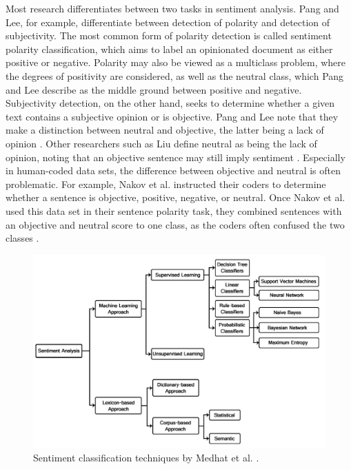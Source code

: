 Most research differentiates between two tasks in sentiment analysis. Pang and Lee, for example, differentiate between detection of polarity and detection of subjectivity. The most common form of polarity detection is called sentiment polarity classification, which aims to label an opinionated document as either positive or negative. Polarity may also be viewed as a multiclass problem, where the degrees of positivity are considered, as well as the neutral class, which Pang and Lee describe as the middle ground between positive and negative. Subjectivity detection, on the other hand, seeks to determine whether a given text contains a subjective opinion or is objective. Pang and Lee note that they make a distinction between neutral and objective, the latter being a lack of opinion \cite{DBLP:journals/ftir/PangL07}. Other researchers such as Liu define neutral as being the lack of opinion, noting that an objective sentence may still imply sentiment \cite{liu_2015}. Especially in human-coded data sets, the difference between objective and neutral is often problematic. For example, Nakov et al. instructed their coders to determine whether a sentence is objective, positive, negative, or neutral. Once Nakov et al. used this data set in their sentence polarity task, they combined sentences with an objective and neutral score to one class, as the coders often confused the two classes \cite{nakov-etal-2013-semeval}.

\begin{figure}
    \centering
    \includegraphics[scale=0.3]{Images/classification_techniques.png}
    \caption{Sentiment classification techniques by Medhat et al. \cite{MEDHAT20141093}.}
    \label{fig:classifiers}
\end{figure}

